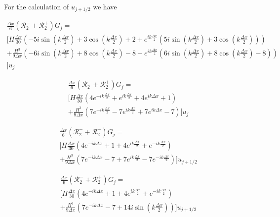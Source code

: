 \documentclass[12pt]{article}
\begin{document}
For the calculation of $u_{j+ 1/2}$ we have

\begin{multline}
\frac{\Delta x}{6}\left( \mathcal{R}^-_2 + \mathcal{R}^+_2\right) G_j  = \\ \Bigg[ H \frac{\Delta x}{30} \left( -5i\sin\left(k \frac{\Delta x}{2}\right) + 3\cos\left(k \frac{\Delta x}{2}\right) + 2  + e^{i k \frac{\Delta x}{2}}\left(5i\sin\left(k \frac{\Delta x}{2}\right) + 3\cos\left(k \frac{\Delta x}{2}\right)\right) \right) \\+
 \frac{H^3 }{9\Delta x} \left(-6i\sin\left(k \frac{\Delta x}{2}\right) + 8\cos\left(k \frac{\Delta x}{2}\right) - 8 +  e^{i k \frac{\Delta x}{2}}\left(6i\sin\left(k \frac{\Delta x}{2}\right) + 8\cos\left(k \frac{\Delta x}{2}\right) - 8\right)\right) \\\Bigg] u_j
\end{multline}

\begin{multline}
\frac{\Delta x}{6}\left( \mathcal{R}^-_2 + \mathcal{R}^+_2\right) G_j  = \\ \Bigg[ H \frac{\Delta x}{30} \left( 4e^{-ik\frac{\Delta x}{2}} + e^{ik\frac{\Delta x}{2}} + 4 e^{ik{\Delta x}} + 1 \right) \\+
\frac{H^3 }{9\Delta x} \left(7e^{-ik\frac{\Delta x}{2}} -7e^{ik\frac{\Delta x}{2}} + 7 e^{ik{\Delta x}} -7\right)\Bigg] u_j
\end{multline}

\begin{multline}
\frac{\Delta x}{6}\left( \mathcal{R}^-_2 + \mathcal{R}^+_2\right) G_j  = \\ \Bigg[ H \frac{\Delta x}{30} \left( 4e^{-ik{\Delta x}} + 1 + 4 e^{ik\frac{\Delta x}{2}} + e^{-ik\frac{\Delta x}{2}} \right) \\+
\frac{H^3 }{9\Delta x} \left(7e^{-ik{\Delta x}} -7 + 7 e^{ik\frac{\Delta x}{2}} -7e^{-ik\frac{\Delta x}{2}}\right)\Bigg] u_{j + 1/2}
\end{multline}

\begin{multline}
\frac{\Delta x}{6}\left( \mathcal{R}^-_2 + \mathcal{R}^+_2\right) G_j  = \\ \Bigg[ H \frac{\Delta x}{30} \left( 4e^{-ik{\Delta x}} + 1 + 4 e^{ik\frac{\Delta x}{2}} + e^{-ik\frac{\Delta x}{2}} \right) \\+
\frac{H^3 }{9\Delta x} \left(7e^{-ik{\Delta x}} -7 + 14i\sin\left(k \frac{\Delta x}{2}\right)\right)\Bigg] u_{j + 1/2}
\end{multline}
\end{document}
